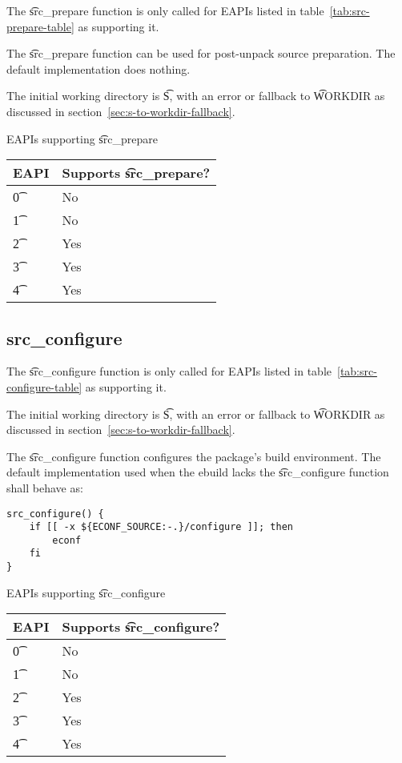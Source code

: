  The \t{src\_prepare} function is only called for EAPIs listed in
table~\ref{tab:src-prepare-table} as supporting it.

The \t{src\_prepare} function can be used for post-unpack source preparation. The default
implementation does nothing.

The initial working directory is \t{S}, with an error or fallback to \t{WORKDIR} as discussed in
section~\ref{sec:s-to-workdir-fallback}.

\begin{centertable}{EAPIs supporting \t{src\_prepare}} \label{tab:src-prepare-table}
    \begin{tabular}{ l l }
        \toprule
        \multicolumn{1}{c}{\textbf{EAPI}} &
        \multicolumn{1}{c}{\textbf{Supports \t{src\_prepare}?}} \\
        \midrule
    \t{0} & No \\
    \t{1} & No \\
    \t{2} & Yes \\
    \t{3} & Yes \\
    \t{4} & Yes \\
    \bottomrule
    \end{tabular}
\end{centertable}

\subsection{src\_configure}
\label{sec:src-configure-function}

 The \t{src\_configure} function is only called for EAPIs listed in
table~\ref{tab:src-configure-table} as supporting it.

The initial working directory is \t{S}, with an error or fallback to \t{WORKDIR} as discussed in
section~\ref{sec:s-to-workdir-fallback}.

The \t{src\_configure} function configures the package's build environment. The default
implementation used when the ebuild lacks the \t{src\_configure} function shall behave as:

\begin{verbatim}
src_configure() {
    if [[ -x ${ECONF_SOURCE:-.}/configure ]]; then
        econf
    fi
}
\end{verbatim}

\begin{centertable}{EAPIs supporting \t{src\_configure}} \label{tab:src-configure-table}
    \begin{tabular}{ l l }
        \toprule
        \multicolumn{1}{c}{\textbf{EAPI}} &
        \multicolumn{1}{c}{\textbf{Supports \t{src\_configure}?}} \\
        \midrule
    \t{0} & No \\
    \t{1} & No \\
    \t{2} & Yes \\
    \t{3} & Yes \\
    \t{4} & Yes \\
    \bottomrule
    \end{tabular}
\end{centertable}

